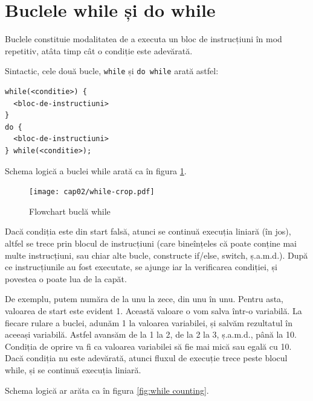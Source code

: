 \section{Buclele while și do while}
Buclele constituie modalitatea de a executa un bloc de instrucțiuni
în mod repetitiv, atâta timp cât o condiție este adevărată.

Sintactic, cele două bucle, \texttt{while} și \texttt{do while} arată astfel:
\begin{lstlisting}
while(<conditie>) {
  <bloc-de-instructiuni>
}
do {
  <bloc-de-instructiuni>
} while(<conditie>);
\end{lstlisting}

Schema logică a buclei while arată ca în figura \ref{fig:flowchart while loop}.

\begin{figure}[ht!]
  \centering
    \texttt{[image: cap02/while-crop.pdf]}
  \caption{Flowchart buclă while}
  \label{fig:flowchart while loop}
\end{figure}

Dacă condiția este din start falsă, atunci se continuă execuția liniară ({\glqq}în jos{\grqq}),
altfel se trece prin blocul de instrucțiuni (care bineînțeles că poate
conține mai multe instrucțiuni, sau chiar alte bucle, constructe if/else, switch, ș.a.m.d.).
După ce instrucțiunile au fost executate, se ajunge iar la verificarea condiției,
și povestea o poate lua de la capăt.


De exemplu, putem număra de la unu la zece, din unu în unu. Pentru asta,
valoarea de start este evident 1. Această valoare o vom salva într-o variabilă.
La fiecare rulare a buclei, adunăm 1 la valoarea variabilei, și salvăm
rezultatul în aceeași variabilă. Astfel avansăm de la 1 la 2, de la 2 la 3,
ș.a.m.d., până la 10. Condiția de oprire va fi ca valoarea variabilei să
fie mai mică sau egală cu 10. Dacă condiția nu este adevărată, atunci fluxul de execuție
{\glqq}trece peste{\grqq} blocul while, și se continuă execuția liniară.

Schema logică ar arăta ca în figura \ref{fig:while counting}.

